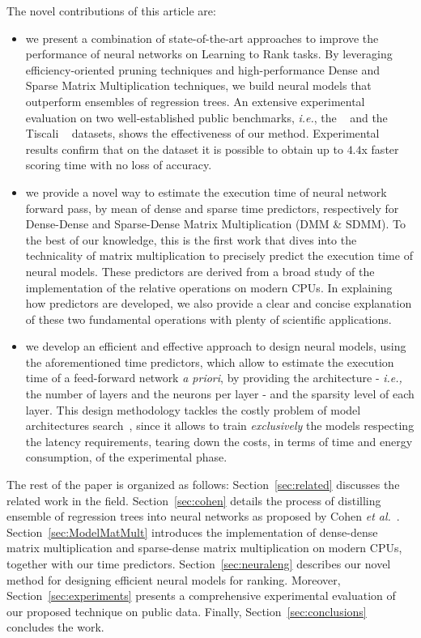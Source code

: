 The novel contributions of this article are:
\begin{itemize}
\item we present a combination of state-of-the-art approaches to improve the performance of neural networks on Learning to Rank tasks. By leveraging efficiency-oriented pruning techniques and high-performance Dense and Sparse Matrix Multiplication techniques, we build neural models that outperform ensembles of regression trees. An extensive experimental evaluation on two well-established public benchmarks, \textit{i.e.}, the \msn~\cite{DBLP:journals/corr/QinL13} and the Tiscali \istella~\cite{dato2016fast} datasets, shows the effectiveness of our method. Experimental results confirm that on the \msn dataset it is possible to obtain up to $4.4$x faster scoring time with no loss of accuracy.

\item we provide a novel way to estimate the execution time of neural network forward pass, by mean of dense and sparse time predictors, respectively for Dense-Dense and Sparse-Dense Matrix Multiplication (DMM \& SDMM). To the best of our knowledge, this is the first work that dives into the technicality of matrix multiplication to precisely predict the execution time of neural models.
These predictors are derived from a broad study of the implementation of the relative operations on modern CPUs. In explaining how predictors are developed, we also provide a clear and concise explanation of these two fundamental operations with plenty of scientific applications. 

\item we develop an efficient and effective approach to design neural models, using the aforementioned time predictors, which allow to estimate the execution time of a feed-forward network \textit{a priori}, by providing the architecture - \textit{i.e.,} the number of layers and the neurons per layer - and the sparsity level of each layer. This design methodology tackles the costly problem of model architectures search~\cite{strubell2019energy,patterson2021carbon}, since it allows to train \emph{exclusively} the models respecting the latency requirements, tearing down the costs, in terms of time and energy consumption, of the experimental phase.
\end{itemize}

The rest of the paper is organized as follows: Section~\ref{sec:related} discusses the related work in the field. Section~\ref{sec:cohen} details the process of distilling ensemble of regression trees into neural networks as proposed by Cohen \emph{et al.}~\cite{cohen2018universal}. Section~\ref{sec:ModelMatMult} introduces the implementation of dense-dense matrix multiplication and sparse-dense matrix multiplication on modern CPUs, together with our time predictors. Section~\ref{sec:neuraleng} describes our novel method for designing efficient neural models for ranking. Moreover, Section~\ref{sec:experiments} presents a comprehensive experimental evaluation of our proposed technique on public data. Finally, Section~\ref{sec:conclusions} concludes the work.


